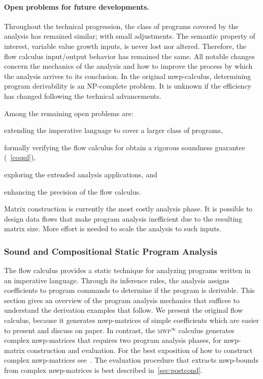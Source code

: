 \paragraph*{Open problems for future developments.}
Throughout the technical progression, the class of programs covered by the analysis has remained similar;
with small adjustments.
The semantic property of interest, variable value growth \wrt inputs, is never lost nor altered.
Therefore, the flow calculus input/output behavior has remained the same.
All notable changes concern the mechanics of the analysis and how to improve the process by which the analysis arrives to its conclusion.
In the original mwp-calculus, determining program derivability is an NP-complete problem.
It is unknown if the efficiency has changed following the technical advancements.

Among the remaining open problems are:
\begin{enumerate*}
\item extending the imperative language to cover a larger class of programs,
\item formally verifying the flow calculus for obtain a rigorous soundness guarantee (\cf~\autoref{coqpl}),
\item exploring the extended analysis applications, and
\item enhancing the precision of the flow calculus.
\end{enumerate*}
Matrix construction is currently the most costly analysis phase.
It is possible to design data flows that make program analysis inefficient due to the resulting matrix size.
More effort is needed to scale the analysis to such inputs.

\subsubsection{Sound and Compositional Static Program Analysis}
\label{mwp-analysis}

The flow calculus provides a static technique for analyzing programs written in an imperative language.
Through its inference rules, the analysis assigns coefficients to program commands to determine if the program is derivable.
This section gives an overview of the program analysis mechanics that suffices to understand the derivation examples that follow.
We present the original flow calculus, because it generates mwp-matrices of simple coefficients which are easier to present and discuss on paper.
In contrast, the \textsc{mwp}\(^\infty\) calculus generates complex mwp-matrices that requires two program analysis phases, for mwp-matrix construction and evaluation.
For the best exposition of how to construct complex mwp-matrices see~.
The evaluation procedure that extracts mwp-bounds from complex mwp-matrices is best described in~\autoref{sec:postcond}.

